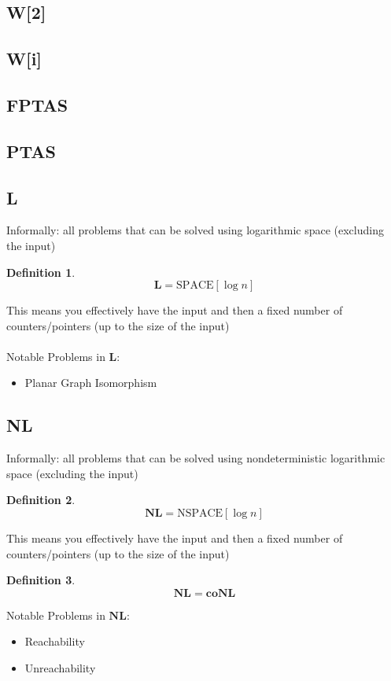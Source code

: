 \documentclass[]{article}
\theoremstyle{definition}
\newtheorem{definition}{Definition}[section]
\begin{document}
\subsection{W[2]}
\subsection{W[i]}
\label{sec:W}
\subsection{FPTAS}

\subsection{PTAS}

\subsection{L}
\label{sec:L}
Informally: all problems that can be solved using logarithmic space (excluding the input)
\\
\begin{definition}
	$$\mathbf{L} = \hyperref[sec:SPACE]{\text{SPACE}[\log n]}$$
\end{definition}
$ $
\\
This means you effectively have the input and then a fixed number of counters/pointers (up to the size of the input)
\\
\\
Notable Problems in $\mathbf{L}$:
\begin{itemize}
	\item Planar Graph Isomorphism
\end{itemize}
\subsection{NL}
\label{sec:NL}
Informally: all problems that can be solved using nondeterministic logarithmic space (excluding the input)
\\
\begin{definition}
	$$\mathbf{NL} = \hyperref[sec:NSPACE]{\text{NSPACE}[\log n]}$$
\end{definition}
$ $
\\
This means you effectively have the input and then a fixed number of counters/pointers (up to the size of the input)
\\
\begin{definition}
	$$\mathbf{NL} = \mathbf{coNL}$$
\end{definition}
$ $
\\
Notable Problems in $\mathbf{NL}$:
\begin{itemize}
	\item Reachability
	\item Unreachability
\end{itemize}
\end{document}
